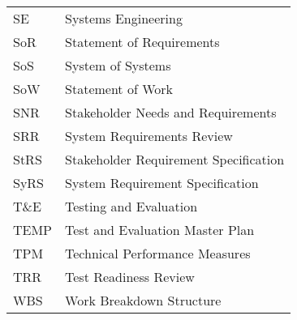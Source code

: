 \documentclass[journal]{IEEEtran}
\begin{document}
\begin{tabular}{ l l }
SE & Systems Engineering \\
SoR & Statement of Requirements \\
SoS & System of Systems \\
SoW & Statement of Work \\
SNR & Stakeholder Needs and Requirements \\
SRR & System Requirements Review \\
StRS & Stakeholder Requirement Specification \\
SyRS & System Requirement Specification \\
T\&E & Testing and Evaluation \\
TEMP & Test and Evaluation Master Plan \\
TPM & Technical Performance Measures \\
TRR & Test Readiness Review \\
WBS & Work Breakdown Structure \\
\end{tabular}
\end{document}
